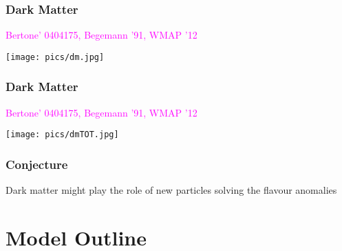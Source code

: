 \documentclass[hyperref={pdfpagelabels=false}]{beamer}
\begin{document}
\begin{frame}
\frametitle{Dark Matter}
 \begin{flushright}
  \textcolor{magenta}{\tiny{Bertone' 0404175, Begemann '91, WMAP '12}}
 \end{flushright}
\setcounter{framenumber}{3}
  \texttt{[image: pics/dm.jpg]}
\end{frame}
\begin{frame}
\frametitle{Dark Matter}
 \begin{flushright}
  \textcolor{magenta}{\tiny{Bertone' 0404175, Begemann '91, WMAP '12}}
 \end{flushright}
\setcounter{framenumber}{3}
  \texttt{[image: pics/dmTOT.jpg]}
\end{frame}

\begin{frame}
 \frametitle{Conjecture}
 Dark matter might play the role of new particles solving the flavour anomalies
\end{frame}



\section{Model Outline}
% 
% 
% 
% 
\end{document}
